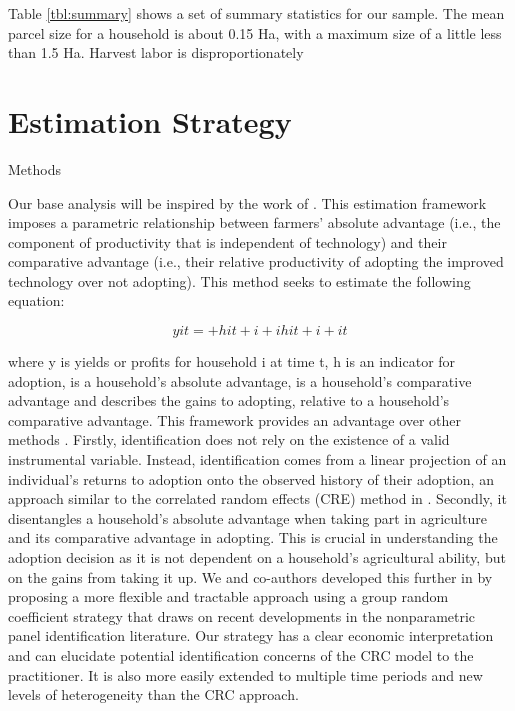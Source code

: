 \documentclass{article}
\begin{document}
Table \ref{tbl:summary} shows a set of summary statistics for our sample. The mean parcel size for a household is about 0.15 Ha, with a maximum size of a little less than 1.5 Ha. Harvest labor is disproportionately 




\section{Estimation Strategy}

Methods 

Our base analysis will be inspired by the work of \citep{Suri2011-oi}. This estimation framework imposes a parametric relationship between farmers' absolute advantage (i.e., the component of productivity that is independent of technology) and their comparative advantage (i.e., their relative productivity of adopting the improved technology over not adopting). This method seeks to estimate the following equation:

$$
yit=+ hit + i+ihit + i+it
$$

where y is yields or profits for household i at time t, h is an indicator for adoption,  is a household’s absolute advantage,  is a household’s comparative advantage and  describes the gains to adopting, relative to a household’s comparative advantage. This framework provides an advantage over other methods \citep{Wooldridge1997-xj,Heckman1998-pt}. Firstly, identification does not rely on the existence of a valid instrumental variable. Instead, identification comes from a linear projection of an individual's returns to adoption onto the observed history of their adoption, an approach similar to the correlated random effects (CRE) method in \citep{Chamberlain1984-uk}. Secondly, it disentangles a household’s absolute advantage when taking part in agriculture and its comparative advantage in adopting. This is crucial in understanding the adoption decision as it is not dependent on a household’s agricultural ability, but on the gains from taking it up. We and co-authors developed this further in \citep{Tjernstrom_Emilia_Dalia_Ghanem_Oscar_Barriga_Cabanillas_Travis_J_Lybbert_Jeffrey_D_Michler_and_Aleksandr_Michuda2020-bc} by proposing a more flexible and tractable approach using a group random coefficient strategy that draws on recent developments in the nonparametric panel identification literature. Our strategy has a clear economic interpretation and can elucidate potential identification concerns of the CRC model to the practitioner. It is also more easily extended to multiple time periods and new levels of heterogeneity than the CRC approach.
\end{document}
